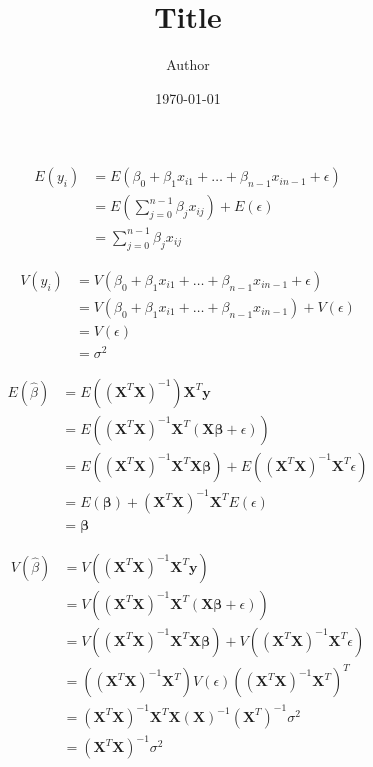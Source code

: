 \documentclass[11pt,a4paper,oldfontcommands]{memoir}
\title{Title}
\author{Author}
\date{\today}
\begin{document}
\begin{align*}
    E(y_i) &= E(\beta_0 + \beta_1x_{i1} + \dots + \beta_{n-1} x_{i n-1} + \epsilon)\\
    &= E\left(\sum_{j=0}^{n-1}\beta_{j}x_{ij}\right) + E(\epsilon)\\
    &= \sum_{j=0}^{n-1}\beta_{j}x_{ij}
\end{align*}

\begin{align*}
    V(y_i) &= V(\beta_0 + \beta_1x_{i1} + \dots + \beta_{n-1} x_{i n-1} + \epsilon)\\
    &= V(\beta_0 + \beta_1x_{i1} + \dots + \beta_{n-1} x_{i n-1}) + V(\epsilon)\\
    &= V(\epsilon)\\
    &= \sigma^2
\end{align*}

\begin{align*}
    E(\hat \beta) &= E((\boldsymbol{X}^T \boldsymbol{X})^{-1})\boldsymbol{X}^T \boldsymbol{y}\\
    &= E((\boldsymbol{X}^T\boldsymbol{X})^{-1} \boldsymbol{X}^T(\boldsymbol{X}\boldsymbol{\beta} + \epsilon))\\
    &= E((\boldsymbol{X}^T\boldsymbol{X})^{-1} \boldsymbol{X}^T\boldsymbol{X}\boldsymbol{\beta}) + E((\boldsymbol{X}^T\boldsymbol{X})^{-1} \boldsymbol{X}^T\epsilon)\\
    &=E(\boldsymbol{\beta}) + (\boldsymbol{X}^T\boldsymbol{X})^{-1} \boldsymbol{X}^TE(\epsilon)\\
    &= \boldsymbol{\beta}
\end{align*}

\begin{align*}
    V(\hat \beta) &= V((\boldsymbol{X}^T\boldsymbol{X})^{-1} \boldsymbol{X}^T\boldsymbol{y})\\
    &= V((\boldsymbol{X}^T\boldsymbol{X})^{-1} \boldsymbol{X}^T(\boldsymbol{X}\boldsymbol{\beta} + \epsilon))\\
    &= V((\boldsymbol{X}^T\boldsymbol{X})^{-1} \boldsymbol{X}^T\boldsymbol{X}\boldsymbol{\beta}) + V((\boldsymbol{X}^T\boldsymbol{X})^{-1} \boldsymbol{X}^T \epsilon)\\
    &= ((\boldsymbol{X}^T\boldsymbol{X})^{-1} \boldsymbol{X}^T) V(\epsilon) ((\boldsymbol{X}^T\boldsymbol{X})^{-1} \boldsymbol{X}^T)^T\\
    &= (\boldsymbol{X}^T\boldsymbol{X})^{-1} \boldsymbol{X}^T\boldsymbol{X}(\boldsymbol{X})^{-1} (\boldsymbol{X}^T)^{-1}\sigma^2\\
    &= (\boldsymbol{X}^T\boldsymbol{X})^{-1}\sigma^2
\end{align*}
\end{document}
